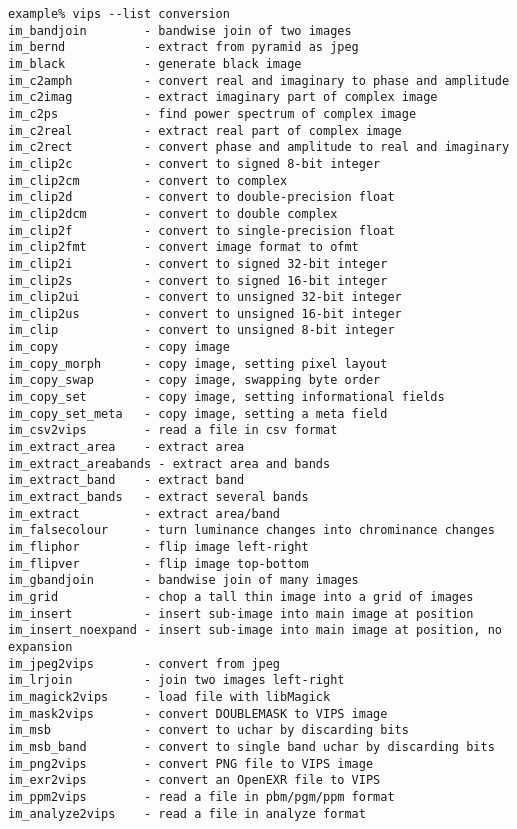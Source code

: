 \begin{fig2}
\begin{verbatim}
example% vips --list conversion
im_bandjoin        - bandwise join of two images
im_bernd           - extract from pyramid as jpeg
im_black           - generate black image
im_c2amph          - convert real and imaginary to phase and amplitude
im_c2imag          - extract imaginary part of complex image
im_c2ps            - find power spectrum of complex image
im_c2real          - extract real part of complex image
im_c2rect          - convert phase and amplitude to real and imaginary
im_clip2c          - convert to signed 8-bit integer
im_clip2cm         - convert to complex
im_clip2d          - convert to double-precision float
im_clip2dcm        - convert to double complex
im_clip2f          - convert to single-precision float
im_clip2fmt        - convert image format to ofmt
im_clip2i          - convert to signed 32-bit integer
im_clip2s          - convert to signed 16-bit integer
im_clip2ui         - convert to unsigned 32-bit integer
im_clip2us         - convert to unsigned 16-bit integer
im_clip            - convert to unsigned 8-bit integer
im_copy            - copy image
im_copy_morph      - copy image, setting pixel layout
im_copy_swap       - copy image, swapping byte order
im_copy_set        - copy image, setting informational fields
im_copy_set_meta   - copy image, setting a meta field
im_csv2vips        - read a file in csv format
im_extract_area    - extract area
im_extract_areabands - extract area and bands
im_extract_band    - extract band
im_extract_bands   - extract several bands
im_extract         - extract area/band
im_falsecolour     - turn luminance changes into chrominance changes
im_fliphor         - flip image left-right
im_flipver         - flip image top-bottom
im_gbandjoin       - bandwise join of many images
im_grid            - chop a tall thin image into a grid of images
im_insert          - insert sub-image into main image at position
im_insert_noexpand - insert sub-image into main image at position, no expansion
im_jpeg2vips       - convert from jpeg
im_lrjoin          - join two images left-right
im_magick2vips     - load file with libMagick
im_mask2vips       - convert DOUBLEMASK to VIPS image
im_msb             - convert to uchar by discarding bits
im_msb_band        - convert to single band uchar by discarding bits
im_png2vips        - convert PNG file to VIPS image
im_exr2vips        - convert an OpenEXR file to VIPS
im_ppm2vips        - read a file in pbm/pgm/ppm format
im_analyze2vips    - read a file in analyze format

\end{verbatim}
\end{fig2}
